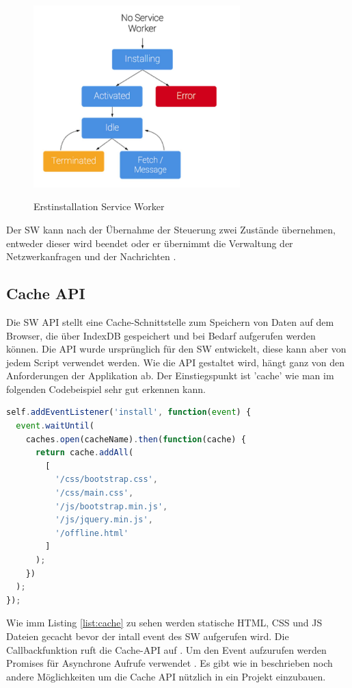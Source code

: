 \begin{figure}[h]
	\centering
	\includegraphics[width=8cm]{BilderAllgemein/InstallSW}\medskip
	\caption{Erstinstallation Service Worker}
	\label{fig:Erstinstallation}\cite{ServiceWorkerRegistration}
\end{figure}

Der \acs{SW} kann nach der Übernahme der Steuerung zwei Zustände übernehmen, entweder dieser wird beendet oder er übernimmt die Verwaltung der Netzwerkanfragen und der Nachrichten \cite{ServiceWorkerRegistration}.



\subsection{Cache API}
Die \acs{SW} API stellt eine Cache-Schnittstelle zum Speichern von Daten auf dem Browser, die über IndexDB \cite{IndexDB} gespeichert und bei Bedarf aufgerufen werden können. Die API wurde ursprünglich für den \acs{SW} entwickelt, diese kann aber von jedem Script verwendet werden. 
Wie die API gestaltet wird, hängt ganz von den Anforderungen der Applikation ab.
Der Einstiegspunkt ist 'cache' wie man im folgenden Codebeispiel sehr gut erkennen kann.

\begin{lstlisting}[language=JavaScript, caption={Service Worker Cache},label=lst:ServiceWorkerCache, xleftmargin=50pt, label=cache]
self.addEventListener('install', function(event) {
  event.waitUntil(
    caches.open(cacheName).then(function(cache) {
      return cache.addAll(
        [
          '/css/bootstrap.css',
          '/css/main.css',
          '/js/bootstrap.min.js',
          '/js/jquery.min.js',
          '/offline.html'
        ]
      );
    })
  );
});
\end{lstlisting}

Wie imm Listing \ref{list:cache} zu sehen werden statische HTML, CSS und JS Dateien gecacht bevor der intall event des \acs{SW} aufgerufen wird. Die Callbackfunktion ruft die Cache-API auf \cite{CacheAPI}.
Um den Event aufzurufen werden Promises für Asynchrone Aufrufe verwendet \cite{Promises}.
Es gibt wie in \cite{CacheAPI} beschrieben noch andere Möglichkeiten um die Cache API nützlich in ein Projekt einzubauen.
\newpage

